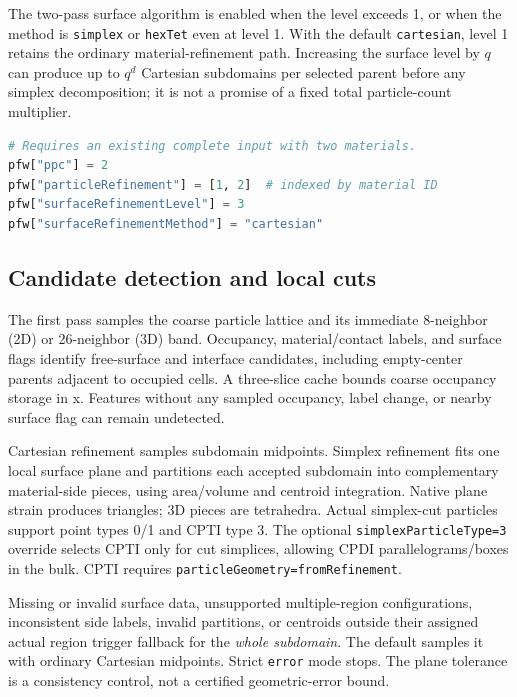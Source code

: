 The two-pass surface algorithm is enabled when the level exceeds 1, or when the method is \texttt{simplex} or \texttt{hexTet} even at level 1. With the default \texttt{cartesian}, level 1 retains the ordinary material-refinement path. Increasing the surface level by $q$ can produce up to $q^d$ Cartesian subdomains per selected parent before any simplex decomposition; it is not a promise of a fixed total particle-count multiplier.

\begin{lstlisting}[language=Python,caption={Cartesian refinement of two materials.}]
# Requires an existing complete input with two materials.
pfw["ppc"] = 2
pfw["particleRefinement"] = [1, 2]  # indexed by material ID
pfw["surfaceRefinementLevel"] = 3
pfw["surfaceRefinementMethod"] = "cartesian"
\end{lstlisting}

\subsection{Candidate detection and local cuts}
The first pass samples the coarse particle lattice and its immediate 8-neighbor (2D) or 26-neighbor (3D) band. Occupancy, material/contact labels, and surface flags identify free-surface and interface candidates, including empty-center parents adjacent to occupied cells. A three-slice cache bounds coarse occupancy storage in x. Features without any sampled occupancy, label change, or nearby surface flag can remain undetected.

Cartesian refinement samples subdomain midpoints. Simplex refinement fits one local surface plane and partitions each accepted subdomain into complementary material-side pieces, using area/volume and centroid integration. Native plane strain produces triangles; 3D pieces are tetrahedra. Actual simplex-cut particles support point types 0/1 and CPTI type 3. The optional \texttt{simplexParticleType=3} override selects CPTI only for cut simplices, allowing CPDI parallelograms/boxes in the bulk. CPTI requires \texttt{particleGeometry=\textquotesingle fromRefinement\textquotesingle}.

Missing or invalid surface data, unsupported multiple-region configurations, inconsistent side labels, invalid partitions, or centroids outside their assigned actual region trigger fallback for the \emph{whole subdomain}. The default samples it with ordinary Cartesian midpoints. Strict \texttt{error} mode stops. The plane tolerance is a consistency control, not a certified geometric-error bound.

